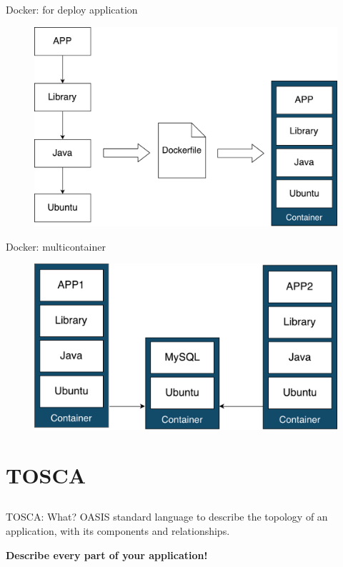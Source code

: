 \documentclass{beamer}
\begin{document}
  \begin{frame}{Docker: for deploy application}
    \begin{figure}
      \includegraphics[width=1\textwidth]{img/docker_build.pdf}
    \end{figure}
  \end{frame}

  \begin{frame}{Docker: multicontainer}
    \begin{figure}
      \includegraphics[width=1\textwidth]{img/docker_multicontainer.pdf}
    \end{figure}
  \end{frame}

\section{TOSCA}\subsection*{}
  \begin{frame}{TOSCA: What?}
    OASIS standard language to describe the topology of an application, with its components and relationships.
    \bigskip

    \centering
    \textbf{Describe every part of your application!}
  \end{frame}
\end{document}
